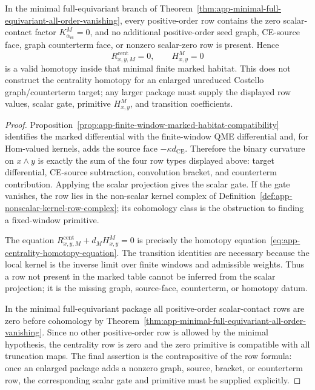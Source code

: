\begin{prop}
  In the minimal full-equivariant branch of
  Theorem~\ref{thm:app-minimal-full-equivariant-all-order-vanishing},
  every positive-order row contains the zero scalar-contact factor
  \(K^M_{\alpha_{\mathrm{sc}}}=0\), and no additional positive-order seed
  graph, CE-source face, graph counterterm face, or nonzero scalar-zero
  row is present.  Hence
  \[
    R^{\mathrm{cent}}_{x,y,M}=0,\qquad H^M_{x,y}=0
  \]
  is a valid homotopy inside that minimal finite marked habitat.  This
  does not construct the centrality homotopy for an enlarged unreduced
  Costello graph/counterterm target; any larger package must supply the
  displayed row values, scalar gate, primitive \(H^M_{x,y}\), and
  transition coefficients.
\end{prop}

\begin{proof}
  Proposition~\ref{prop:app-finite-window-marked-habitat-compatibility}
  identifies the marked differential with the finite-window QME
  differential and, for Hom-valued kernels, adds the source face
  \(-\kappa d_{\mathrm{CE}}\).  Therefore the binary curvature on
  \(x\wedge y\) is exactly the sum of the four row types displayed above:
  target differential, CE-source subtraction, convolution bracket, and
  counterterm contribution.  Applying the scalar projection gives the
  scalar gate.  If the gate vanishes, the row lies in the non-scalar
  kernel complex of
  Definition~\ref{def:app-nonscalar-kernel-row-complex}; its cohomology
  class is the obstruction to finding a fixed-window primitive.

  The equation
  \(R^{\mathrm{cent}}_{x,y,M}+d_M H^M_{x,y}=0\) is precisely the
  homotopy
  equation~\eqref{eq:app-centrality-homotopy-equation}.  The transition
  identities are necessary because the local kernel is the inverse limit
  over finite windows and admissible weights.  Thus a row not present in
  the marked table cannot be inferred from the scalar projection; it is
  the missing graph, source-face, counterterm, or homotopy datum.

  In the minimal full-equivariant package all positive-order scalar-contact
  rows are zero before cohomology by
  Theorem~\ref{thm:app-minimal-full-equivariant-all-order-vanishing}.
  Since no other positive-order row is allowed by the minimal hypothesis,
  the centrality row is zero and the zero primitive is compatible with
  all truncation maps.  The final assertion is the contrapositive of the
  row formula: once an enlarged package adds a nonzero graph, source,
  bracket, or counterterm row, the corresponding scalar gate and primitive
  must be supplied explicitly.
\end{proof}

